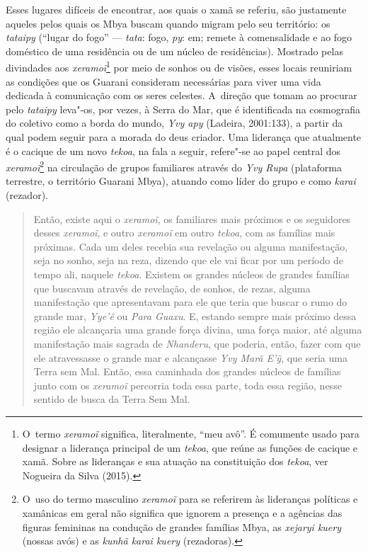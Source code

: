 Esses lugares difíceis de encontrar, aos quais o xamã se referiu, são
justamente aqueles pelos quais os Mbya buscam quando migram pelo seu
território: os \emph{tataipy} (``lugar do fogo'' --- \emph{tata}: fogo,
\emph{py}: em; remete à comensalidade e ao fogo doméstico de uma
residência ou de um núcleo de residências). Mostrado pelas divindades
aos \emph{xeramoĩ}\footnote{O~termo \emph{xeramoĩ} significa,
literalmente, ``meu avô''. É
comumente usado para designar a liderança principal de um \emph{tekoa}, que
reúne as funções de cacique e xamã. Sobre as lideranças e sua atuação
na constituição dos \emph{tekoa}, ver Nogueira da Silva (2015).} por meio de
sonhos ou de visões, esses locais reuniriam as condições que os Guarani
consideram necessárias para viver uma vida dedicada à comunicação com
os seres celestes. A~direção que tomam ao procurar pelo \emph{tataipy}
leva"-os, por vezes, à Serra do Mar, que é identificada na cosmografia
do coletivo como a borda do mundo, \emph{Yvy apy} (Ladeira, 2001:133), a
partir da qual podem seguir para a morada do deus criador. Uma
liderança que atualmente é o cacique de um novo \emph{tekoa}, na fala a
seguir, refere"-se ao papel central dos
\emph{xeramoĩ}\footnote{O~uso do termo masculino
\emph{xeramoĩ} para se referirem às lideranças políticas
e xamânicas em geral não significa que ignorem a presença e a agências
das figuras femininas na condução de grandes famílias Mbya, as \emph{xejaryi
kuery} (nossas avós) e as \emph{kunhã karai kuery} (rezadoras).} na circulação
de grupos familiares através do \emph{Yvy Rupa} (plataforma terrestre, o
território Guarani Mbya), atuando como líder do grupo e como \emph{karai}
(rezador).

\begin{quote}
Então, existe aqui o \emph{xeramoĩ}, os familiares mais
próximos e os seguidores desses \emph{xeramoĩ}, e outro
\emph{xeramoĩ} em outro \emph{tekoa}, com as famílias mais
próximas. Cada um deles recebia sua revelação ou alguma manifestação,
seja no sonho, seja na reza, dizendo que ele vai ficar por um período
de tempo ali, naquele \emph{tekoa}. Existem os grandes núcleos de grandes
famílias que buscavam através de revelação, de sonhos, de rezas, alguma
manifestação que apresentavam para ele que teria que buscar o rumo do
grande mar, \emph{Yye’\~{e}} ou \emph{Para Guaxu}. E, estando sempre mais próximo
dessa região ele alcançaria uma grande força divina, uma força maior,
até alguma manifestação mais sagrada de \emph{Nhanderu}, que poderia, então,
fazer com que ele atravessasse o grande mar e alcançasse \emph{Yvy Marã
E’ỹ}, que seria uma Terra sem Mal. Então, essa caminhada dos grandes
núcleos de famílias junto com os \emph{xeramoĩ}
percorria toda essa parte, toda essa região, nesse sentido de busca da
Terra Sem Mal.
\end{quote}

